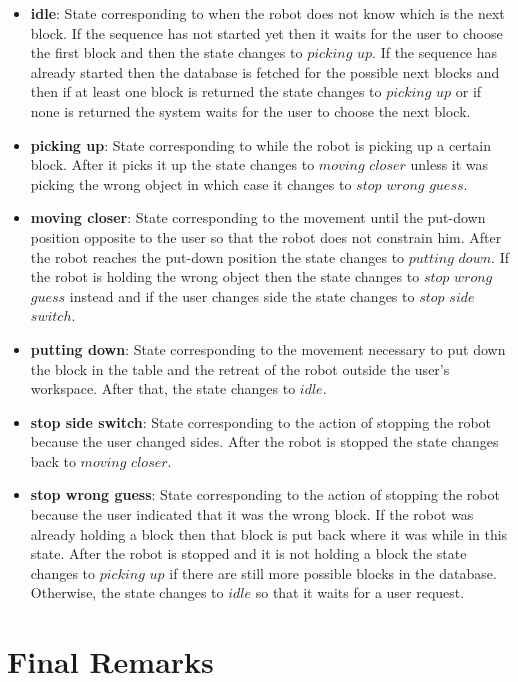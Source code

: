 \begin{itemize}
    \item \textbf{idle}: State corresponding to when the robot does not know which is the next block. If the sequence has not started yet then it waits for the user to choose the first block and then the state changes to $picking$ $up$. If the sequence has already started then the database is fetched for the possible next blocks and then if at least one block is returned the state changes to $picking$ $up$ or if none is returned the system waits for the user to choose the next block.
    \item \textbf{picking up}: State corresponding to while the robot is picking up a certain block. After it picks it up the state changes to $moving$ $closer$ unless it was picking the wrong object in which case it changes to $stop$ $wrong$ $guess$.
    \item \textbf{moving closer}: State corresponding to the movement until the put-down position opposite to the user so that the robot does not constrain him. After the robot reaches the put-down position the state changes to $putting$ $down$. If the robot is holding the wrong object then the state changes to $stop$ $wrong$ $guess$ instead and if the user changes side the state changes to $stop$ $side$ $switch$.
    \item \textbf{putting down}: State corresponding to the movement necessary to put down the block in the table and the retreat of the robot outside the user's workspace. After that, the state changes to $idle$.
    \item \textbf{stop side switch}: State corresponding to the action of stopping the robot because the user changed sides. After the robot is stopped the state changes back to $moving$ $closer$.
    \item \textbf{stop wrong guess}: State corresponding to the action of stopping the robot because the user indicated that it was the wrong block. If the robot was already holding a block then that block is put back where it was while in this state. After the robot is stopped and it is not holding a block the state changes to $picking$ $up$ if there are still more possible blocks in the database. Otherwise, the state changes to $idle$ so that it waits for a user request.
\end{itemize}

\section{Final Remarks}